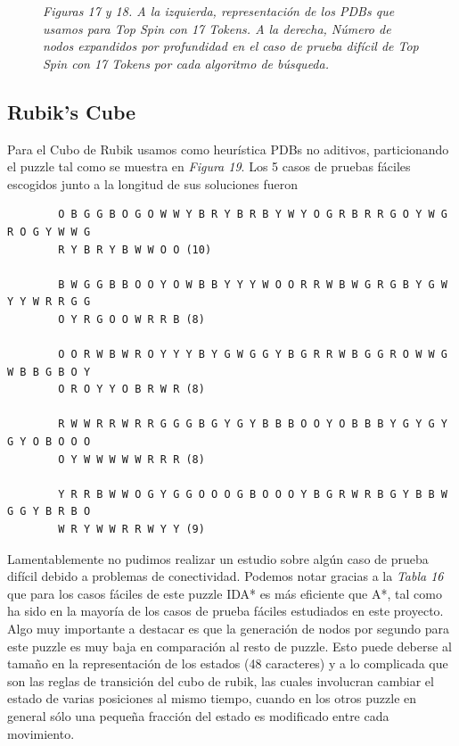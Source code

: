 \documentclass[a4paper,10pt]{article}
\begin{document}
\begin{figure}[t!]
      \small{\textit{Figuras 17 y 18. A la izquierda, representaci\'on de los
      PDBs que usamos para Top Spin con 17 Tokens. A la derecha, N\'umero 
      de nodos expandidos por profundidad en el caso de prueba dif\'icil de
      Top Spin con 17 Tokens por cada algoritmo de b\'usqueda.}}
    \end{figure}

  \subsection{Rubik's Cube}
    Para el Cubo de Rubik usamos como heur\'istica PDBs no aditivos, 
    particionando el puzzle tal como se muestra en \textit{Figura 19}. Los 5 casos de pruebas f\'aciles escogidos junto a la 
    longitud de sus soluciones fueron
    
    \begin{verbatim}
        O B G G B O G O W W Y B R Y B R B Y W Y O G R B R R G O Y W G R O G Y W W G 
        R Y B R Y B W W O O (10)
        
        B W G G B B O O Y O W B B Y Y Y W O O R R W B W G R G B Y G W Y Y W R R G G 
        O Y R G O O W R R B (8)

        O O R W B W R O Y Y Y B Y G W G G Y B G R R W B G G R O W W G W B B G B O Y 
        O R O Y Y O B R W R (8)
        
        R W W R R W R R G G G B G Y G Y B B B O O Y O B B B Y G Y G Y G Y O B O O O
        O Y W W W W W R R R (8)
        
        Y R R B W W O G Y G G O O O G B O O O Y B G R W R B G Y B B W G G Y B R B O 
        W R Y W W R R W Y Y (9)
    \end{verbatim}
    
    Lamentablemente no pudimos realizar un estudio sobre alg\'un
    caso de prueba dif\'icil debido a problemas de conectividad.
    Podemos notar gracias a la \textit{Tabla 16} que para los 
    casos f\'aciles de este puzzle IDA* es m\'as eficiente que A*,
    tal como ha sido en la mayor\'ia de los casos de prueba f\'aciles
    estudiados en este proyecto. Algo muy importante a destacar es
    que la generaci\'on de nodos por segundo para este puzzle es
    muy baja en comparaci\'on al resto de puzzle. Esto puede deberse
    al tama\~no en la representaci\'on de los estados (48 caracteres)
    y a lo complicada que son las reglas de transici\'on del cubo
    de rubik, las cuales involucran cambiar el estado de varias
    posiciones al mismo tiempo, cuando en los otros puzzle en general
    s\'olo una peque\~na fracci\'on del estado es modificado entre
    cada movimiento.
  
\end{document}
